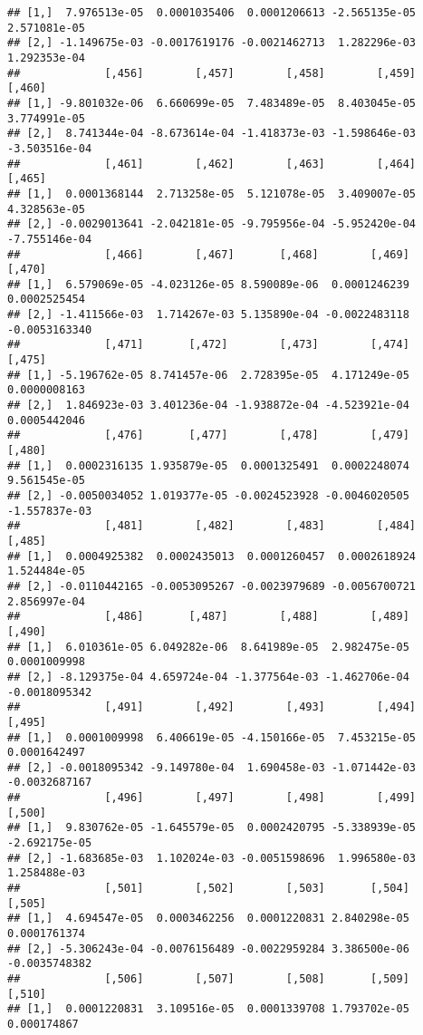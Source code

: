 \documentclass[
]{article}
\begin{document}
\begin{verbatim}
## [1,]  7.976513e-05  0.0001035406  0.0001206613 -2.565135e-05 2.571081e-05
## [2,] -1.149675e-03 -0.0017619176 -0.0021462713  1.282296e-03 1.292353e-04
##             [,456]        [,457]        [,458]        [,459]        [,460]
## [1,] -9.801032e-06  6.660699e-05  7.483489e-05  8.403045e-05  3.774991e-05
## [2,]  8.741344e-04 -8.673614e-04 -1.418373e-03 -1.598646e-03 -3.503516e-04
##             [,461]        [,462]        [,463]        [,464]        [,465]
## [1,]  0.0001368144  2.713258e-05  5.121078e-05  3.409007e-05  4.328563e-05
## [2,] -0.0029013641 -2.042181e-05 -9.795956e-04 -5.952420e-04 -7.755146e-04
##             [,466]        [,467]       [,468]        [,469]        [,470]
## [1,]  6.579069e-05 -4.023126e-05 8.590089e-06  0.0001246239  0.0002525454
## [2,] -1.411566e-03  1.714267e-03 5.135890e-04 -0.0022483118 -0.0053163340
##             [,471]       [,472]        [,473]        [,474]       [,475]
## [1,] -5.196762e-05 8.741457e-06  2.728395e-05  4.171249e-05 0.0000008163
## [2,]  1.846923e-03 3.401236e-04 -1.938872e-04 -4.523921e-04 0.0005442046
##             [,476]       [,477]        [,478]        [,479]        [,480]
## [1,]  0.0002316135 1.935879e-05  0.0001325491  0.0002248074  9.561545e-05
## [2,] -0.0050034052 1.019377e-05 -0.0024523928 -0.0046020505 -1.557837e-03
##             [,481]        [,482]        [,483]        [,484]       [,485]
## [1,]  0.0004925382  0.0002435013  0.0001260457  0.0002618924 1.524484e-05
## [2,] -0.0110442165 -0.0053095267 -0.0023979689 -0.0056700721 2.856997e-04
##             [,486]       [,487]        [,488]        [,489]        [,490]
## [1,]  6.010361e-05 6.049282e-06  8.641989e-05  2.982475e-05  0.0001009998
## [2,] -8.129375e-04 4.659724e-04 -1.377564e-03 -1.462706e-04 -0.0018095342
##             [,491]        [,492]        [,493]        [,494]        [,495]
## [1,]  0.0001009998  6.406619e-05 -4.150166e-05  7.453215e-05  0.0001642497
## [2,] -0.0018095342 -9.149780e-04  1.690458e-03 -1.071442e-03 -0.0032687167
##             [,496]        [,497]        [,498]        [,499]        [,500]
## [1,]  9.830762e-05 -1.645579e-05  0.0002420795 -5.338939e-05 -2.692175e-05
## [2,] -1.683685e-03  1.102024e-03 -0.0051598696  1.996580e-03  1.258488e-03
##             [,501]        [,502]        [,503]       [,504]        [,505]
## [1,]  4.694547e-05  0.0003462256  0.0001220831 2.840298e-05  0.0001761374
## [2,] -5.306243e-04 -0.0076156489 -0.0022959284 3.386500e-06 -0.0035748382
##             [,506]        [,507]        [,508]       [,509]       [,510]
## [1,]  0.0001220831  3.109516e-05  0.0001339708 1.793702e-05  0.000174867

\end{verbatim}
\end{document}
